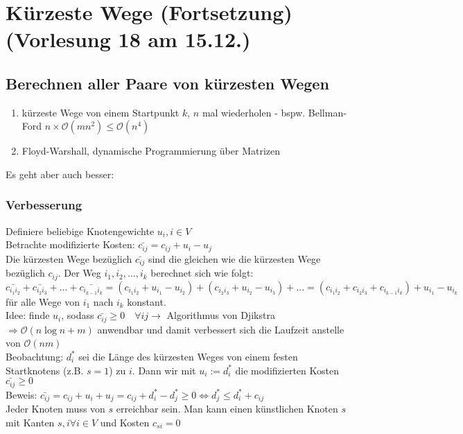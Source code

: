 \section{Kürzeste Wege (Fortsetzung)\tiny (Vorlesung 18 am 15.12.)}
\subsection{Berechnen aller Paare von kürzesten Wegen}
\begin{enumerate}
\item kürzeste Wege von einem Startpunkt $k$, $n$ mal wiederholen - bspw. Bellman-Ford $n\times \mathcal{O}(mn^2) \leq \mathcal{O}(n^4)$
\item Floyd-Warshall, dynamische Programmierung über Matrizen
\end{enumerate}
Es geht aber auch besser:\\
\subsubsection{Verbesserung}
Definiere beliebige Knotengewichte $u_i, i \in V$\\
Betrachte modifizierte Kosten: $\bar{c_{ij}} = c_{ij} + u_i - u_j$\\ 
Die kürzesten Wege bezüglich $\bar{c_{ij}}$ sind die gleichen wie die kürzesten Wege bezüglich $c_{ij}$. Der Weg $i_1,i_2, ... , i_k$ berechnet sich wie folgt: $\bar{c_{i_1i_2}} + \bar{c_{i_2i_3}} +  ... + \bar{c_{i_{k-1}i_k}} = (c_{i_1 i_2} + u_i_1 - u_i_2) + (c_{i_2 i_3} + u_i_2 - u_i_3) + ... = (c_{i_1 i_2} + c_{i_2 i_3} + c_{i_{k-1} i_k}) + u_i_1 - u_i_k$ für alle Wege von $i_1$ nach $i_k$ konstant.\\
Idee: finde $u_i$, sodass $\bar{c_{ij}} \geq 0 \quad \forall ij \rightarrow$ Algorithmus von Djikstra $\Rightarrow \mathcal{O}(n \log n +m)$ anwendbar und damit verbessert sich die Laufzeit anstelle von $\mathcal{O}(nm)$\\
Beobachtung: $d_i^*$ sei die Länge des kürzesten Weges von einem festen Startknotens (z.B. $s=1$) zu $i$. Dann wir mit $u_i := d_i^*$ die modifizierten Kosten $\bar{c_{ij}} \geq 0$\\
Beweis: $\bar{c_{ij}} = c_{ij} + u_i + u_j = c_{ij} + d_i^* - d_j^* \geq 0 \Leftrightarrow d_j^* \leq d_i^* + c_{ij}$\\
Jeder Knoten muss von $s$ erreichbar sein. Man kann einen künstlichen Knoten $s$ mit Kanten $s,i \forall i \in V$ und Kosten $c_{si} = 0$\\
